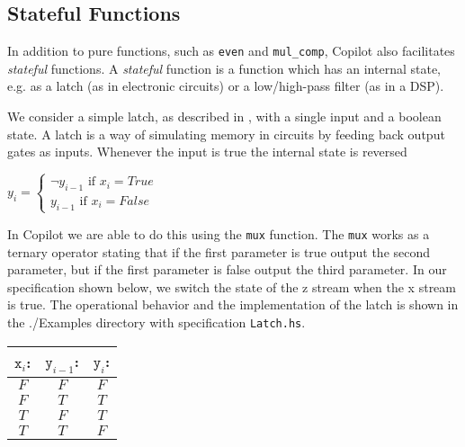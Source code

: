 \subsection{Stateful Functions} \label{sec:stateful}

In addition to pure functions, such as {\tt even} and {\tt mul\_comp}, Copilot
also facilitates \emph{stateful} functions.
%
A \emph{stateful} function is a function which has an internal state, e.g. as a
latch (as in electronic circuits) or a low/high-pass filter (as in a DSP).

\begin{example} We consider a simple latch, as described in \cite{Farhat2004},
with a single input and a boolean state.
%
A latch is a way of simulating memory in circuits by feeding back output gates
as inputs.
%
Whenever the input is true the internal state is reversed 
%
\begin{center}
${y}_{i}=\begin{cases}
\neg{y}_{i-1} \text{ if } {x}_{i} = True\\
{y}_{i-1} \text{ if } {x}_{i} = False
\end{cases}$
\end{center} 
%
In Copilot we are able to do this using the {\tt mux} function.
%
The {\tt mux} works as a ternary operator stating that if the first parameter is true output the second parameter, but if the first parameter is false output the third parameter.
%
In our specification shown below, we switch the state of the z stream when the x stream is true. 
%
The operational behavior and the implementation of the latch is shown in the
./Examples directory with specification {\tt Latch.hs}.

\begin{center}
\begin{minipage}{0.25\linewidth}
\begin{tabular}{c|c||c}
$\mathtt{x}_i$: & $\mathtt{y}_{i-1}$: & $\mathtt{y}_i$:\\
\hline
$F$ & $F$ & $F$ \\
\hline
$F$ & $T$ & $T$ \\
\hline
$T$ & $F$ & $T$ \\
\hline
$T$ & $T$ & $F$
\end{tabular}
\end{minipage}
\end{center}
\end{example}




